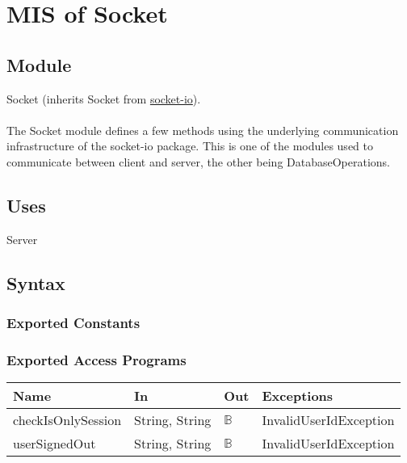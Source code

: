 \documentclass[12pt, titlepage]{article}
\begin{document}
  
\medskip
\newpage
\section{MIS of Socket} \label{Socket} 

\subsection{Module}

Socket (inherits Socket from \href{https://socket.io/docs/v4/client-socket-instance/}{socket-io}).\\ \\
The Socket module defines a few methods using the underlying communication infrastructure of the socket-io package. This is one of the modules used to communicate between client and server, the other being DatabaseOperations.

\subsection{Uses}

Server

\subsection{Syntax}

\subsubsection{Exported Constants}

\subsubsection{Exported Access Programs}

\begin{center}
\begin{tabular}{p{4cm} p{4cm} p{4cm} p{2cm}}
\hline
\textbf{Name} & \textbf{In} & \textbf{Out} & \textbf{Exceptions} \\
\hline
checkIsOnlySession & String, String & $\mathbb{B}$ & InvalidUserIdException \\ \hline
userSignedOut & String, String & $\mathbb{B}$ & InvalidUserIdException \\
\hline
\end{tabular}
\end{center}
\end{document}
